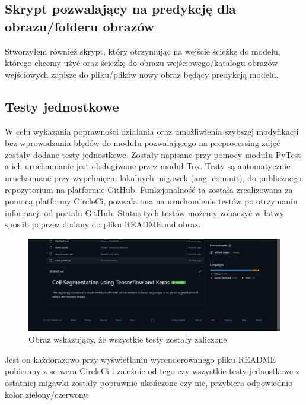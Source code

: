 \documentclass{article}
\begin{document}
\subsection{Skrypt pozwalający na predykcję dla obrazu/folderu obrazów}
Stworzyłem również skrypt, który otrzymując na wejście ścieżkę do modelu, którego chcemy użyć oraz
ścieżkę do obrazu wejściowego/katalogu obrazów wejściowych zapisze do pliku/plików nowy obraz będący predykcją modelu.
\subsection{Testy jednostkowe}
W celu wykazania poprawności działania oraz umożliwienia szybszej modyfikacji bez wprowadzania błędów do modułu pozwalającego na preprocessing zdjęć zostały dodane testy jednostkowe.
Zostały napisane przy pomocy modułu PyTest a ich uruchamianie jest obsługiwane przez moduł Tox.
Testy są automatycznie uruchamiane przy wypchnięciu lokalnych migawek (ang. commit), do publicznego repozytorium na platformie GitHub.
Funkcjonalność ta została zrealizowana za pomocą platformy CircleCi, pozwala ona na uruchomienie testów po otrzymaniu informacji od portalu GitHub.
Status tych testów możemy zobaczyć w łatwy sposób poprzez dodany do pliku README.md obraz.
\begin{figure}[H]
    \centering
    \includegraphics[width=\linewidth]{images/ci.png}
    \caption{Obraz wskazujący, że wszystkie testy zostały zaliczone}
\end{figure}
Jest on każdorazowo przy wyświetlaniu wyrenderowanego pliku README pobierany z serwera CircleCi i zależnie od tego czy wszystkie testy jednostkowe z ostatniej migawki zostały poprawnie ukończone czy nie, przybiera odpowiednio kolor zielony/czerwony.
\end{document}
